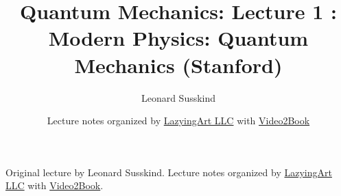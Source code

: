 \documentclass[11pt,oneside]{book}
\begin{document}
\frontmatter
\title{Quantum Mechanics: Lecture 1 : Modern Physics: Quantum Mechanics (Stanford)}
\author{Leonard Susskind}
\date{Lecture notes organized by \href{https://lazying.art}{LazyingArt LLC} with \href{https://github.com/lachlanchen/Video2Book}{Video2Book}}
\maketitle
\begin{center}
\small Original lecture by Leonard Susskind. Lecture notes organized by \href{https://lazying.art}{LazyingArt LLC} with \href{https://github.com/lachlanchen/Video2Book}{Video2Book}.
\end{center}
\clearpage
\mainmatter

\end{document}

